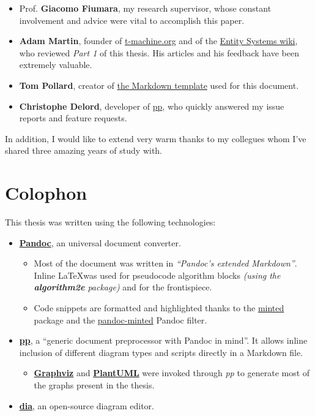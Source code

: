 \documentclass[twoside, 12pt, a4paper, openany]{book}
\providecommand{\tightlist}{%
  \setlength{\itemsep}{0pt}\setlength{\parskip}{0pt}}
\begin{document}
\begin{itemize}
\item
  Prof. \textbf{Giacomo Fiumara}, my research supervisor, whose constant
  involvement and advice were vital to accomplish this paper.
\item
  \textbf{Adam Martin}, founder of
  \href{http://t-machine.org/}{t-machine.org} and of the
  \href{http://entity-systems.wikidot.com/}{Entity Systems wiki}, who
  reviewed \emph{Part 1} of this thesis. His articles and his feedback
  have been extremely valuable.
\item
  \textbf{Tom Pollard}, creator of
  \href{https://github.com/tompollard/phd_thesis_markdown}{the Markdown
  template} used for this document.
\item
  \textbf{Christophe Delord}, developer of
  \href{https://github.com/CDSoft/pp}{pp}, who quickly answered my issue
  reports and feature requests.
\end{itemize}

In addition, I would like to extend very warm thanks to my collegues
whom I've shared three amazing years of study with.

\chapter*{Colophon}\label{colophon}

This thesis was written using the following technologies:

\begin{itemize}
\item
  \href{http://pandoc.org/}{\textbf{Pandoc}}, an universal document
  converter.

  \begin{itemize}
  \item
    Most of the document was written in \emph{``Pandoc's extended
    Markdown''}. Inline \LaTeX was used for pseudocode algorithm blocks
    \emph{(using the \textbf{algorithm2e} package)} and for the
    frontispiece.
  \item
    Code snippets are formatted and highlighted thanks to the
    \href{https://github.com/gpoore/minted}{minted} package and the
    \href{https://github.com/nick-ulle/pandoc-minted}{pandoc-minted}
    Pandoc filter.
  \end{itemize}
\item
  \href{https://github.com/CDSoft/pp}{\textbf{pp}}, a ``generic document
  preprocessor with Pandoc in mind''. It allows inline inclusion of
  different diagram types and scripts directly in a Markdown file.

  \begin{itemize}
  \tightlist
  \item
    \href{http://www.graphviz.org}{\textbf{Graphviz}} and
    \href{http://plantuml.com/}{\textbf{PlantUML}} were invoked through
    \emph{pp} to generate most of the graphs present in the thesis.
  \end{itemize}
\item
  \href{http://dia-installer.de/}{\textbf{dia}}, an open-source diagram
  editor.
\end{itemize}
\end{document}
